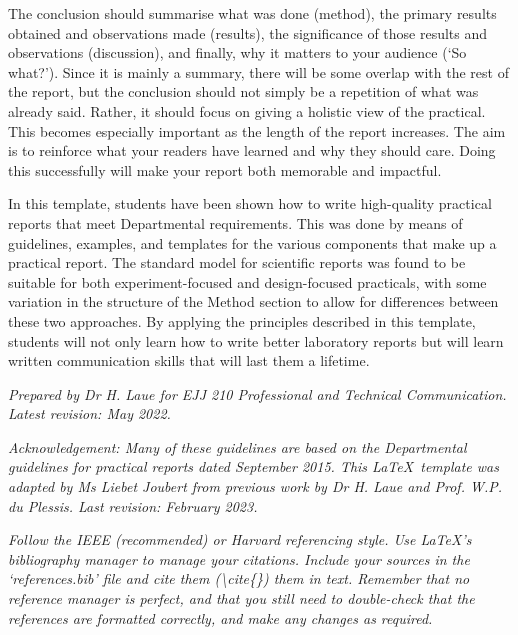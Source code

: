 \documentclass[a4paper, onecolumn, 12pt]{IEEEtran}
\begin{document}
The conclusion should summarise what was done (method), the primary results obtained and observations made (results), the significance of those results and observations (discussion), and finally, why it matters to your audience (`So what?'). Since it is mainly a summary, there will be some overlap with the rest of the report, but the conclusion should not simply be a repetition of what was already said. Rather, it should focus on giving a holistic view of the practical. This becomes especially important as the length of the report increases. The aim is to reinforce what your readers have learned and why they should care. Doing this successfully will make your report both memorable and impactful.

In this template, students have been shown how to write high-quality practical reports that meet Departmental requirements. This was done by means of guidelines, examples, and templates for the various components that make up a practical report. The standard model for scientific reports was found to be suitable for both experiment-focused and design-focused practicals, with some variation in the structure of the Method section to allow for differences between these two approaches. By applying the principles described in this template, students will not only learn how to write better laboratory reports but will learn written communication skills that will last them a lifetime.

\textit{Prepared by Dr H. Laue for EJJ 210 Professional and Technical Communication. Latest revision: May 2022. }

\textit{Acknowledgement: Many of these guidelines are based on the Departmental guidelines for practical reports dated September 2015. This \LaTeX\ template was adapted by Ms Liebet Joubert from previous work by Dr H. Laue and Prof. W.P. du Plessis. Last revision: February 2023.}



\IEEEtriggercmd{\normalsize}

%
%

\textit{Follow the IEEE (recommended) or Harvard referencing style. Use \LaTeX's  bibliography manager to manage your citations. Include your sources in the `references.bib' file and cite them (\textbackslash cite\{\}) them in text. Remember that no reference manager is perfect, and that you still need to double-check that the references are formatted correctly, and make any changes as required.}
\end{document}
